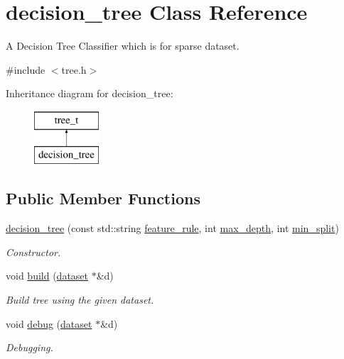 \hypertarget{classdecision__tree}{\section{decision\+\_\+tree Class Reference}
\label{classdecision__tree}
}


A Decision Tree Classifier which is for sparse dataset.  




{\ttfamily \#include $<$tree.\+h$>$}

Inheritance diagram for decision\+\_\+tree\+:\begin{figure}[H]
\begin{center}
\leavevmode
\includegraphics[height=2.000000cm]{classdecision__tree}
\end{center}
\end{figure}
\subsection*{Public Member Functions}
\begin{DoxyCompactItemize}
\item 
\hyperlink{classdecision__tree_ac90ebb549d50e49ec8322d6ee8335eb8}{decision\+\_\+tree} (const std\+::string \hyperlink{classtree_a5aba3b77a347165517a20d5fab94382d}{feature\+\_\+rule}, int \hyperlink{classtree_a0a9f968fac827d3239be67488c34fb21}{max\+\_\+depth}, int \hyperlink{classtree_ae70cd626c0b50a0b8306a94a9e5e8fd7}{min\+\_\+split})
\begin{DoxyCompactList}\small\item\em Constructor. \end{DoxyCompactList}\item 
void \hyperlink{classdecision__tree_ad3286ad0d5361f3f19ddac966477b14a}{build} (\hyperlink{classdataset}{dataset} $\ast$\&d)
\begin{DoxyCompactList}\small\item\em Build tree using the given dataset. \end{DoxyCompactList}\item 
void \hyperlink{classdecision__tree_a738fa3b8ccbb86fea50d93acab273bde}{debug} (\hyperlink{classdataset}{dataset} $\ast$\&d)
\begin{DoxyCompactList}\small\item\em Debugging. \end{DoxyCompactList}\end{DoxyCompactItemize}
